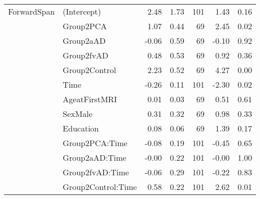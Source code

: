 \documentclass[]{article}
\begin{document}
\begin{table}[ht]
{\begin{tabular}{llrrrrr}
  ForwardSpan & (Intercept) & 2.48 & 1.73 & 101 & 1.43 & 0.16 \\ 
   & Group2PCA & 1.07 & 0.44 & 69 & 2.45 & 0.02 \\ 
   & Group2aAD & -0.06 & 0.59 & 69 & -0.10 & 0.92 \\ 
   & Group2fvAD & 0.48 & 0.53 & 69 & 0.92 & 0.36 \\ 
   & Group2Control & 2.23 & 0.52 & 69 & 4.27 & 0.00 \\ 
   & Time & -0.26 & 0.11 & 101 & -2.30 & 0.02 \\ 
   & AgeatFirstMRI & 0.01 & 0.03 & 69 & 0.51 & 0.61 \\ 
   & SexMale & 0.31 & 0.32 & 69 & 0.98 & 0.33 \\ 
   & Education & 0.08 & 0.06 & 69 & 1.39 & 0.17 \\ 
   & Group2PCA:Time & -0.08 & 0.19 & 101 & -0.45 & 0.65 \\ 
   & Group2aAD:Time & -0.00 & 0.22 & 101 & -0.00 & 1.00 \\ 
   & Group2fvAD:Time & -0.06 & 0.29 & 101 & -0.22 & 0.83 \\ 
   & Group2Control:Time & 0.58 & 0.22 & 101 & 2.62 & 0.01 \\ 
   \hline
\end{tabular}
}
\end{table}
\end{document}
